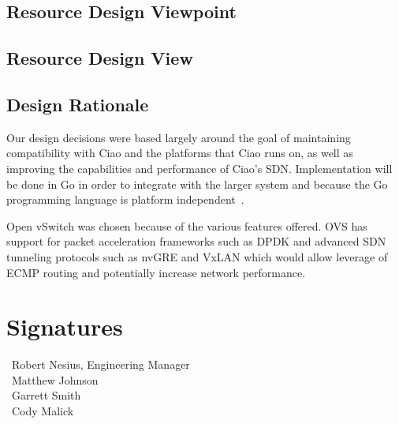 \documentclass[10pt,onecolumn,journal,draftclsnofoot]{IEEEtran}
\begin{document}
\subsection{Resource Design Viewpoint}

\subsection{Resource Design View}

\subsection{Design Rationale}

Our design decisions were based largely around the goal of maintaining
compatibility with Ciao and the platforms that Ciao runs on, as well as
improving the capabilities and performance of Ciao's SDN. Implementation will be
done in Go in order to integrate with the larger system and because the Go
programming language is platform independent~\cite{gogoodfor}.

Open vSwitch was chosen because of the various features offered. OVS has support
for packet acceleration frameworks such as DPDK and advanced SDN tunneling
protocols such as nvGRE and VxLAN which would allow leverage of ECMP routing and
potentially increase network performance.

\clearpage
\section{Signatures}
\vspace{2cm}
\begin{flushleft}
	\noindent\hspace{0.7cm}\makebox[1.5in]{\hrulefill}~Robert Nesius, Engineering Manager\\
	\vspace{1cm}
	\hspace{0.7cm}\makebox[1.5in]{\hrulefill}~Matthew Johnson\\
	\vspace{1cm}
	\hspace{0.7cm}\makebox[1.5in]{\hrulefill}~Garrett Smith\\
	\vspace{1cm}
	\hspace{0.7cm}\makebox[1.5in]{\hrulefill}~Cody Malick
\end{flushleft}
\end{document}
